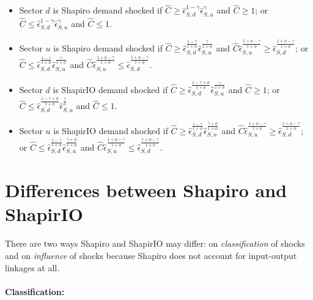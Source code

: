 \documentclass[12pt,english]{article}
\begin{document}
\begin{itemize}
	\item \textcolor{bluenice}{Sector $d$ is Shapiro demand shocked if $\hat{C}\geq \hat{\epsilon}_{S,d}^{1-\gamma}\hat{\epsilon}_{S,u}^{\gamma}$ and $\hat{C} \geq 1$; or $\hat{C}\leq \hat{\epsilon}_{S,d}^{1-\gamma}\hat{\epsilon}_{S,u}^{\gamma}$ and $\hat{C} \leq 1$.}
	\item \textcolor{bluenice}{Sector $u$ is Shapiro demand shocked if $\hat{C}\geq \hat{\epsilon}_{S,d}^{\frac{1-\gamma}{1+\phi}}\hat{\epsilon}_{S,u}^{\frac{\gamma}{1+\phi}}$ and $\hat{C}\hat{\epsilon}_{S,u}^{\frac{1+\phi-\gamma}{1+\phi}}\geq \hat{\epsilon}_{S,d}^{\frac{1+\phi-\gamma}{1+\phi}}$; or  $\hat{C}\leq \hat{\epsilon}_{S,d}^{\frac{1-\gamma}{1+\phi}}\hat{\epsilon}_{S,u}^{\frac{\gamma}{1+\phi}}$ and $\hat{C}\hat{\epsilon}_{S,u}^{\frac{1+\phi-\gamma}{1+\phi}}\leq \hat{\epsilon}_{S,d}^{\frac{1+\phi-\gamma}{1+\phi}}$.}
	\item \textcolor{orangenice}{Sector $d$ is ShapirIO demand shocked if $\hat{C}\geq \hat{\epsilon}_{S,d}^{\frac{1-\gamma+\phi}{1+\phi}}\hat{\epsilon}_{S,u}^{\frac{\gamma}{1+\phi}}$ and $\hat{C} \geq 1$; or $\hat{C}\leq \hat{\epsilon}_{S,d}^{\frac{1-\gamma+\phi}{1+\phi}}\hat{\epsilon}_{S,u}^{\frac{\gamma}{\phi}}$ and $\hat{C} \leq 1$.}
	\item \textcolor{orangenice}{Sector $u$ is ShapirIO demand shocked if $\hat{C}\geq \hat{\epsilon}_{S,d}^{\frac{1-\gamma}{1+\phi}}\hat{\epsilon}_{S,u}^{\frac{\gamma+\phi}{1+\phi}}$ and $\hat{C}\hat{\epsilon}_{S,u}^{\frac{1+\phi-\gamma}{1+\phi}}\geq \hat{\epsilon}_{S,d}^{\frac{1+\phi-\gamma}{1+\phi}}$; or $\hat{C}\leq \hat{\epsilon}_{S,d}^{\frac{1-\gamma}{1+\phi}}\hat{\epsilon}_{S,u}^{\frac{\gamma+\phi}{1+\phi}}$ and $\hat{C}\hat{\epsilon}_{S,u}^{\frac{1+\phi-\gamma}{1+\phi}}\leq \hat{\epsilon}_{S,d}^{\frac{1+\phi-\gamma}{1+\phi}}$.}
\end{itemize}

\section*{Differences between Shapiro and ShapirIO}

There are two ways Shapiro and ShapirIO may differ: on \emph{classification} of shocks and on \emph{influence} of shocks because Shapiro does not account for input-output linkages at all.

\paragraph{Classification:}
\end{document}
